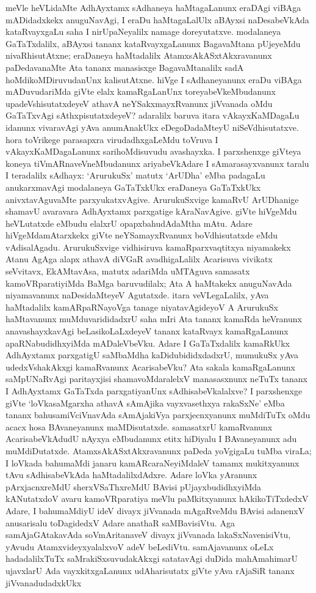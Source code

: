 meVle heVLidaMte AdhAyxtamx sAdhaneya haMtagaLanunx eraDAgi viBAga mADidadxkekx anuguNavAgi, I eraDu haMtagaLalUlx aBAyxsi naDesabeVkAda kataRvayxgaLu saha I nirUpaNeyalilx namage doreyutatxve. modalaneya GaTaTxdalilx, aBAyxsi tananx kataRvayx\-gaLanunx BagavaMtana pUjeyeMdu nivaRhisutAtxne; eraDaneya haMtadalilx AtamxsAkASx\-tAkxravanunx paDedavanaMte Ata tananx manasisxge BagavaMtanalilx sadA hoMdikoMDiru\-vu\-danUnx kalisutAtxne. hiVge I sAdhaneyanunx eraDu viBAga mADuvudariMda giVte elalx kamaRgaLanUnx toreyabeVkeMbudanunx upadeVshisutatxdeyeV athavA neYSakxmayxR\-vanunx jiVvanada oMdu GaTaTxvAgi sAthxpisutatxdeyeV? adaralilx baruva itara vAkayxKaMDa\-gaLu idanunx vivaravAgi yAva anumAnakUkx eDegoDadaMteyU niSeVdhisutatxve. hora toVrikege parasapxra virudadhxgaLeMdu toVruva I vAkayxKaMDagaLanunx sarihoMdi\-suvudu avashayxka. I parxshenxge giVteya koneya tiVmARnaveVneMbudanunx ariyabeVkAdare I sAmarasayxvanunx taralu I teradalilx sAdhayx: `ArurukuSx' matutx `ArUDha' eMba padagaLu anukarxmavAgi modalaneya GaTaTxkUkx eraDaneya GaTaTxkUkx anivxtavAguvaMte parxyukatxvAgive. ArurukuSxvige kamaRvU ArUDhanige shamavU avaravara AdhAyxtamx parxgatige kAraNavAgive. giVte hiVgeMdu heVLutatxde eMbudu elalxrU opapxbahudAdaMtha mAtu. Adare hiVgeMdamAtarxkekx giVte neYSamayxRvanunx boVdhisutatxde eMdu vAdisalAgadu. ArurukuSxvige vidhisiruva kamaRparxvaqtitxya niyamakekx Atanu AgAga alapx athavA diVGaR avadhigaLalilx Acarisuva vivikatx seVvitavx, EkAMtavAsa, matutx adariMda uMTAguva samasatx kamoVRparatiyiMda BaMga baruvudilalx; Ata A haMtakekx anuguNavAda niyamavanunx naDesidaMteyeV Agutatxde. itara veVLegaLalilx, yAva haMtadalilx kamARpaRNayoVga tanage niyatavAgideyoV A ArurukuSx haMtavanunx muMduvarididadxrU saha mIri Ata tananx kamaRda heVranunx anavashayxkavAgi beLasikoLaLxdeyeV tananx kataRvayx kamaRgaLanunx apaRNabudidhxyiMda mADaleVbeVku. Adare I GaTaTxdalilx kamaRkUkx AdhAyxtamx parxgatigU saMbaMdha kaDidubididxdadxrU, mumukuSx yAva udedxVshakAkxgi kamaRvanunx AcarisabeVku? Ata sakala kamaRgaLanunx saMpUNaRvAgi paritayxjisi shamavoMdaralelxV manasasxnunx neTuTx tananx I AdhAyxtamx GaTaTxda parxgatiyanUnx sAdhisabeVkalalxve? I parxshenxge giVte `loVkasaMgarxha athavA sAmAjika vayxvasethxya rakaSxNe' eMba tananx bahusamiVciVnavAda sAmAjakiVya parxjecnxyanunx muMdiTuTx oMdu acacx hosa BAvaneyanunx maMDisutatxde. samasatxrU kamaRvanunx AcarisabeVkAdudU nAyxya eMbudanunx etitx hiDiyalu I BAvaneyanunx adu muMdiDutatxde. AtamxsAkASxtAkxravanunx paDeda yoVgigaLu tuMba viraLa; I loVkada bahumaMdi janaru kamARcaraNeyiMdaleV tamamx mukitxyanunx tAvu sAdhisabeVkAda haMtadalilxdAdxre. Adare loVka yAranunx pArxjacnxreMdU sherxVSaThxreMdU BAvisi pUjayxbudidhxyiMda kANutatxdoV avaru kamoVRparatiya meVlu paMkitxyanunx hAkikoTiTxdedxV Adare, I bahumaMdiyU ideV divayx jiVvanada mAgaRveMdu BAvisi adanenxV anusarisalu toDagidedxV Adare anathaR saMBavisiVtu. Aga samAjaGAtakavAda soVmAritanaveV divayx jiVvanada lakaSxNavenisiVtu, yAvudu AtamxvideyxyalalxvoV adeV beLediVtu. samAjavanunx oLeLx hadadalilxTuTx saMrakiSxsuvudakAkxgi satatavAgi duDida mahAmahimarU ujavxlarU Ada vayxkitxgaLanunx udAharisutatx giVte yAva rAjaSiR tananx jiVvanadudadxkUkx 